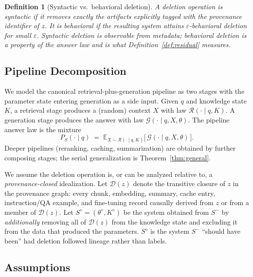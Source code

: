 \documentclass[10pt,journal,compsoc]{IEEEtran}
\newtheorem{definition}{Definition}
\begin{document}
\begin{definition}[Syntactic vs.\ behavioral deletion]
\label{def:syntactic}
A deletion operation is \emph{syntactic} if it removes exactly the
artifacts explicitly tagged with the provenance identifier of $z$. It is
\emph{behavioral} if the resulting system attains
$\varepsilon$-behavioral deletion for small $\varepsilon$. Syntactic
deletion is observable from metadata; behavioral deletion is a property
of the answer law and is what Definition~\ref{def:residual} measures.
\end{definition}

\subsection{Pipeline Decomposition}

We model the canonical retrieval-plus-generation pipeline as two stages
with the parameter state entering generation as a side input. Given $q$
and knowledge state $K$, a retrieval stage produces a (random) context
$X$ with law $\mathcal{R}(\cdot\mid q,K)$. A generation stage produces
the answer with law $\mathcal{G}(\cdot\mid q,X,\theta)$. The pipeline
answer law is the mixture
\begin{equation}
\label{eq:pipeline}
 P_{S}(\cdot\mid q)
 \;=\;
 \mathbb{E}_{X\sim\mathcal{R}(\cdot\mid q,K)}
 \big[\,\mathcal{G}(\cdot\mid q,X,\theta)\,\big].
\end{equation}
Deeper pipelines (reranking, caching, summarization) are obtained by
further composing stages; the serial generalization is
Theorem~\ref{thm:general}.

We assume the deletion operation is, or can be analyzed relative to, a
\emph{provenance-closed} idealization. Let $\mathcal{D}(z)$ denote the
transitive closure of $z$ in the provenance graph: every chunk,
embedding, summary, cache entry, instruction/QA example, and
fine-tuning record causally derived from $z$ or from a member of
$\mathcal{D}(z)$. Let $S^{\diamond}=(\theta^{\diamond},K^{\diamond})$ be
the system obtained from $S^{-}$ by \emph{additionally} removing all of
$\mathcal{D}(z)$ from the knowledge state and excluding it from the data
that produced the parameters. $S^{\diamond}$ is the system $S^{-}$
``should have been'' had deletion followed lineage rather than labels.

\subsection{Assumptions}
\end{document}
